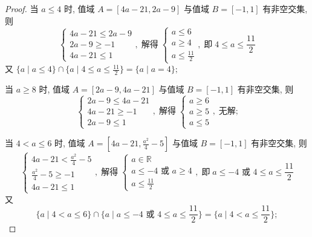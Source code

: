 \begin{proof}
当 \(a \leq  4\) 时, 值域 \(A = \left\lbrack  {{4a} - {21}, {2a} - 9}\right\rbrack\) 与值域 \(B = \left\lbrack  {-1, 1}\right\rbrack\) 有非空交集, 则
\[
\begin{cases}
{4a} - {21} \leq {2a} - 9 \\
{2a} - 9 \geq  -1 \\
{4a} - {21} \leq  1
\end{cases}, 
\; \text{解得} \;
\begin{cases}
a \leq 6 \\
a \geq  4 \\
a \leq  \frac{11}{2}
\end{cases}, 
\; \text{即} \; 4 \leq  a \leq  \frac{11}{2}
\]
又 \(\{ a \mid  a \leq  4\}  \cap  \{ a \mid  4 \leq  a \leq \frac{11}{2}\} = \{ a \mid  a = 4\}; \)

当 \(a \geq  8\) 时, 值域 \(A = \left\lbrack  {{2a} - 9, {4a} - {21}}\right\rbrack\) 与值域 \(B = \left\lbrack  {-1, 1}\right\rbrack\) 有非空交集, 则
\[
\begin{cases}
{2a} - 9 \leq {4a} - {21} \\
{4a} - {21} \geq  -1 \\
{2a} - 9 \leq  1
\end{cases}, 
\; \text{解得} \;
\begin{cases}
a \geq 6 \\
a \geq  5 \\
a \leq  5
\end{cases}, 
\; \text{无解;}
\]

当 \(4 < a \leq  6\) 时, 值域 \(A = \left\lbrack  {{4a} - {21}, \frac{{a}^{2}}{4} - 5}\right\rbrack\) 与值域 \(B = \left\lbrack  {-1, 1}\right\rbrack\) 有非空交集, 则
\[
\begin{cases}
{4a} - {21} < \frac{{a}^{2}}{4} - 5 \\
\frac{{a}^{2}}{4} - 5 \geq  -1 \\
{4a} - {21} \leq  1
\end{cases}, 
\; \text{解得} \;
\begin{cases}
a \in \mathbb{R} \\
a \leq  -4\text{ 或 }a \geq  4 \\
a \leq  \frac{11}{2}
\end{cases}, 
\; \text{即} \; a \leq  -4\text{ 或 }4 \leq  a \leq  \frac{11}{2}
\]
又
\[
\{ a \mid  4 < a \leq  6\}  \cap  \{ a \mid  a \leq  -4\text{ 或 }4 \leq  a \leq  \frac{11}{2}\} = \{ a \mid  4 < a \leq  \frac{11}{2}\};
\]


\end{proof}
